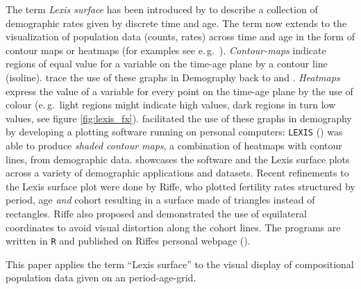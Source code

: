 \documentclass[a4paper, 12pt]{scrartcl}
\begin{document}
The term \emph{Lexis surface} has been introduced by \textcite{Arthur1984} to describe a collection of demographic rates given by discrete time and age. The term now extends to the visualization of population data (counts, rates) across time and age in the form of contour maps or heatmaps (for examples see e.\,g.~\cite{Rau2008, Scherbov2002}). \emph{Contour-maps} indicate regions of equal value for a variable on the time-age plane by a contour line (isoline). \textcite{Vaupel1987} trace the use of these graphs in Demography back to \textcite{Kermack1934} and \textcite{Delaporte1941}. \emph{Heatmaps} express the value of a variable for every point on the time-age plane by the use of colour (e.\,g.~light regions might indicate high values, dark regions in turn low values, see figure \ref{fig:lexis_fx}). \citeauthor{Gambill1985} facilitated the use of these graphs in demography by developing a plotting software running on personal computers: \texttt{LEXIS} (\cite{Gambill1985}) was able to produce \emph{shaded contour maps}, a combination of heatmaps with contour lines, from demographic data.  showcases the software and the Lexis surface plots across a variety of demographic applications and datasets. Recent refinements to the Lexis surface plot were done by Riffe, who plotted fertility rates structured by period, age \emph{and} cohort resulting in a surface made of triangles instead of rectangles. Riffe also proposed and demonstrated the use of equilateral coordinates to avoid visual distortion along the cohort lines. The programs are written in \texttt{R} and published on Riffes personal webpage (\cite{Riffe2014}).

This paper applies the term \enquote{Lexis surface} to the visual display of compositional population data given on an period-age-grid.
\end{document}
